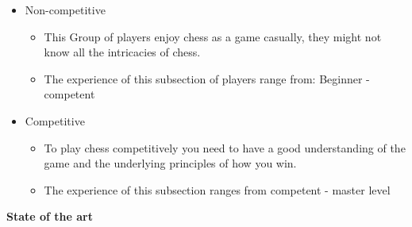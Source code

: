 \begin{itemize}
    \item Non-competitive
    \begin{itemize}
        \item This Group of players enjoy chess as a game casually,
        they might not know all the intricacies of chess.
        \item The experience of this subsection of players range from: Beginner - competent
    \end{itemize}
    \item Competitive
    \begin{itemize}
        \item To play chess competitively you need to have a good understanding
        of the game and the underlying principles of how you win.
        \item The experience of this subsection ranges from competent - master level
    \end{itemize}
\end{itemize}

\textbf{State of the art}


